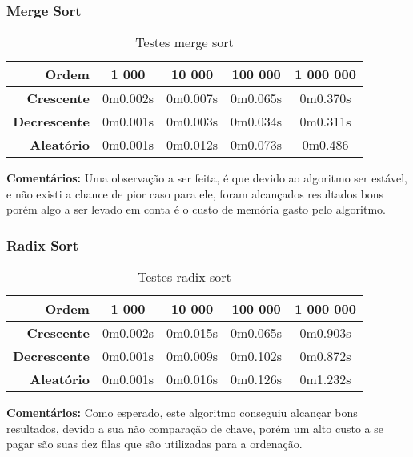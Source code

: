 \documentclass[
	12pt,				%
	oneside,			%
	a4paper,			%
	english,			%
	brazil,				%
	]{article}
\begin{document}
\subsubsection{Merge Sort}
\begin{table}[H]
\centering
\begin{tabular}{|r|c|c|c|c|}
\cline{1-5} 
 \textbf{Ordem} & \textbf{1 000} & \textbf{10 000} & \textbf{100 000} & \textbf{1 000 000}\\
 \hline
 \textbf{Crescente} & 0m0.002s & 0m0.007s & 0m0.065s & 0m0.370s \\
 \hline
 \textbf{Decrescente} & 0m0.001s & 0m0.003s & 0m0.034s & 0m0.311s \\
 \hline
 \textbf{Aleat{\'o}rio} & 0m0.001s & 0m0.012s & 0m0.073s & 0m0.486 \\
 \hline
\end{tabular} 
\caption{Testes merge sort}
\end{table}
\indent \textbf{Comentários:} Uma observação a ser feita, é que devido ao algoritmo ser estável, e não existi a chance de pior caso para ele, foram alcançados resultados bons
porém algo a ser levado em conta é o custo de memória gasto pelo algoritmo.


\subsubsection{Radix Sort}
\begin{table}[H]
\centering
\begin{tabular}{|r|c|c|c|c|}
\cline{1-5} 
 \textbf{Ordem} & \textbf{1 000} & \textbf{10 000} & \textbf{100 000} & \textbf{1 000 000}\\
 \hline
 \textbf{Crescente} & 0m0.002s & 0m0.015s & 0m0.065s & 0m0.903s \\
 \hline
 \textbf{Decrescente} & 0m0.001s & 0m0.009s & 0m0.102s & 0m0.872s \\
 \hline
 \textbf{Aleat{\'o}rio} & 0m0.001s & 0m0.016s & 0m0.126s & 0m1.232s \\
 \hline
\end{tabular} 
\caption{Testes radix sort}
\end{table}
\indent \textbf{Comentários:} Como esperado, este algoritmo conseguiu alcançar bons resultados, devido a sua não comparação de chave, porém um alto custo a se pagar são
suas dez filas que são utilizadas para a ordenação.
\end{document}
